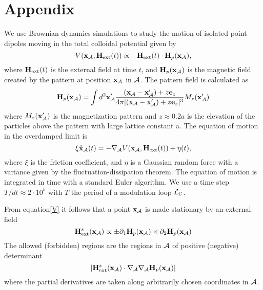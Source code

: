 \documentclass[12pt]{iopart}
\begin{document}

\section{Appendix}
We use Brownian dynamics simulations to study the motion of isolated point dipoles moving in the total colloidal potential given by
 	\begin{equation}\label{V}
V({\bf x}_{\cal A},{\bf H}_{\textrm{ext}}(t))\propto -{\bf H}_{\textrm{ext}}(t)\cdot {\bf H}_p({\bf x}_{\cal A}),
 \end{equation}
 where ${\bf H}_{\textrm{ext}}(t)$ is the external field at time $t$, and ${\bf H}_p({\bf x}_{\cal A})$ is the magnetic
 field created by the pattern at position ${\bf x}_{\cal A}$ in $\cal A$. The pattern field is calculated as 
 	\begin{equation}
{\bf H}_p({\bf x}_{\cal A})=\int d^2 {\bf x}_{\cal A}' \frac{({\bf x}_{\cal A}-{\bf x}_{\cal A}')+z{\bf e}_z }{4\pi|({\bf x}_{\cal A}-{\bf x}_{\cal A}')+z{\bf e}_z|^3} M_z({\bf x}_{\cal A}')
\end{equation}
 where $M_z({\bf x}_{\cal A}')$ is the magnetization pattern and $z\approx 0.2 a$ is the elevation of the particles above the pattern with large lattice constant a.
 The equation of motion in the overdamped limit is
	\begin{equation}
	{\bf \xi\dot x_{\cal A}}(t)=-\nabla_{\cal A} V({\bf x}_{\cal A},{\bf H}_{\textrm{ext}}(t))+\eta(t),
	\end{equation}
	where $\xi$ is the friction coefficient, and $\eta$ is a Gaussian random force with a variance given by
	the fluctuation-dissipation theorem. The equation of motion is integrated in time with a standard Euler
        algorithm. We use a time step $T/dt\approx2\cdot10^5$ with $T$ the period of a modulation loop ${\cal L_C}$. 



	From equation\ref{V} it follows that a point ${\bf x}_{\cal A}$ is made stationary by an external field 
	\begin{equation}
	{\bf H}_{\textrm{ext}}^s({\bf x}_{\cal A})\propto\pm\partial_1{\bf H}_p({\bf x}_{\cal A})\times\partial_2{\bf H}_p({\bf x}_{\cal A})
	\end{equation}
	The allowed (forbidden) regions are the regions in $\cal A$ of positive (negative) determinant
	  	\begin{equation}
       | {\bf H}_{\textrm{ext}}^s({\bf x}_{\cal A})\cdot \nabla_{\cal A}\nabla_{\cal A}{\bf H}_p({\bf x}_{\cal A})|
	 \end{equation}
	 where the partial derivatives are taken along arbitrarily chosen coordinates in $\cal A$.
\end{document}
